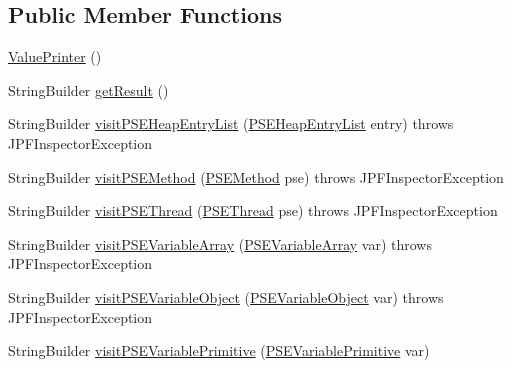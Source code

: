 \subsection*{Public Member Functions}
\begin{DoxyCompactItemize}
\item 
\hyperlink{classgov_1_1nasa_1_1jpf_1_1inspector_1_1client_1_1commands_1_1_cmd_print_1_1_value_printer_a0d5774eec97f453d44d532892386d5a9}{Value\+Printer} ()
\item 
String\+Builder \hyperlink{classgov_1_1nasa_1_1jpf_1_1inspector_1_1client_1_1commands_1_1_cmd_print_1_1_value_printer_aa7ffd5ef783bc1a2d7c691e53280b237}{get\+Result} ()
\item 
String\+Builder \hyperlink{classgov_1_1nasa_1_1jpf_1_1inspector_1_1client_1_1commands_1_1_cmd_print_1_1_value_printer_a3beefe042d19c70b3143c405ed6a4118}{visit\+P\+S\+E\+Heap\+Entry\+List} (\hyperlink{classgov_1_1nasa_1_1jpf_1_1inspector_1_1common_1_1pse_1_1_p_s_e_heap_entry_list}{P\+S\+E\+Heap\+Entry\+List} entry)  throws J\+P\+F\+Inspector\+Exception 
\item 
String\+Builder \hyperlink{classgov_1_1nasa_1_1jpf_1_1inspector_1_1client_1_1commands_1_1_cmd_print_1_1_value_printer_a3f0eb11af5535dfa66a4b8df66c36a55}{visit\+P\+S\+E\+Method} (\hyperlink{classgov_1_1nasa_1_1jpf_1_1inspector_1_1common_1_1pse_1_1_p_s_e_method}{P\+S\+E\+Method} pse)  throws J\+P\+F\+Inspector\+Exception 
\item 
String\+Builder \hyperlink{classgov_1_1nasa_1_1jpf_1_1inspector_1_1client_1_1commands_1_1_cmd_print_1_1_value_printer_a8c8bad5a43d723b27a87341f0b1a74ad}{visit\+P\+S\+E\+Thread} (\hyperlink{classgov_1_1nasa_1_1jpf_1_1inspector_1_1common_1_1pse_1_1_p_s_e_thread}{P\+S\+E\+Thread} pse)  throws J\+P\+F\+Inspector\+Exception 
\item 
String\+Builder \hyperlink{classgov_1_1nasa_1_1jpf_1_1inspector_1_1client_1_1commands_1_1_cmd_print_1_1_value_printer_a2d5dd97c9d82697f7681ff53374f8241}{visit\+P\+S\+E\+Variable\+Array} (\hyperlink{classgov_1_1nasa_1_1jpf_1_1inspector_1_1common_1_1pse_1_1_p_s_e_variable_array}{P\+S\+E\+Variable\+Array} var)  throws J\+P\+F\+Inspector\+Exception 
\item 
String\+Builder \hyperlink{classgov_1_1nasa_1_1jpf_1_1inspector_1_1client_1_1commands_1_1_cmd_print_1_1_value_printer_ac87825ddc80faaea556401d3b29dd38e}{visit\+P\+S\+E\+Variable\+Object} (\hyperlink{classgov_1_1nasa_1_1jpf_1_1inspector_1_1common_1_1pse_1_1_p_s_e_variable_object}{P\+S\+E\+Variable\+Object} var)  throws J\+P\+F\+Inspector\+Exception 
\item 
String\+Builder \hyperlink{classgov_1_1nasa_1_1jpf_1_1inspector_1_1client_1_1commands_1_1_cmd_print_1_1_value_printer_a4199b39249b8deea48dfe26106712bda}{visit\+P\+S\+E\+Variable\+Primitive} (\hyperlink{classgov_1_1nasa_1_1jpf_1_1inspector_1_1common_1_1pse_1_1_p_s_e_variable_primitive}{P\+S\+E\+Variable\+Primitive} var)
\end{DoxyCompactItemize}
